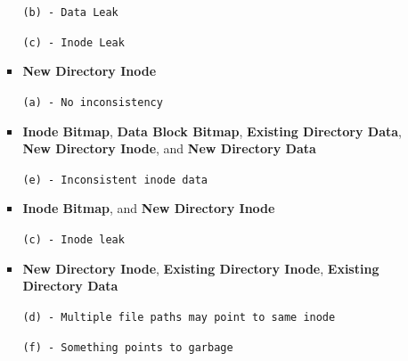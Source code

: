 \documentclass[12pt]{article}
\begin{document}
\begin{enumerate}[1.]
\begin{enumerate}
\begin{mdframed}
\begin{itemize}
            \bigskip

            \texttt{(b) - Data Leak}

            \texttt{(c) - Inode Leak}

            \item \textbf{New Directory Inode}

            \bigskip

            \texttt{(a) - No inconsistency}

            \item \textbf{Inode Bitmap}, \textbf{Data Block Bitmap}, \textbf{Existing Directory Data},
            \textbf{New Directory Inode}, and \textbf{New Directory Data}

            \bigskip

            \texttt{(e) - Inconsistent inode data}

            \item \textbf{Inode Bitmap}, and \textbf{New Directory Inode}

            \bigskip

            \texttt{(c) - Inode leak}

            \item \textbf{New Directory Inode}, \textbf{Existing Directory Inode}, \textbf{Existing Directory Data}

            \bigskip

            \color{red}\texttt{(d) - Multiple file paths may point to same inode}\color{black}

            \texttt{(f) - Something points to garbage}
        \end{itemize}


        \end{mdframed}

        \bigskip





\end{enumerate}
\end{enumerate}
\end{document}
